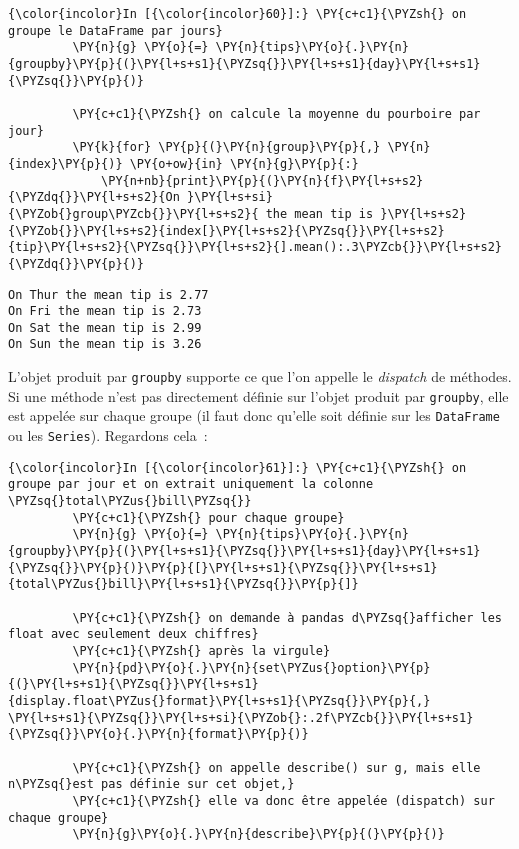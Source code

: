     \begin{Verbatim}[commandchars=\\\{\},frame=single,framerule=0.3mm,rulecolor=\color{cellframecolor}]
{\color{incolor}In [{\color{incolor}60}]:} \PY{c+c1}{\PYZsh{} on groupe le DataFrame par jours}
         \PY{n}{g} \PY{o}{=} \PY{n}{tips}\PY{o}{.}\PY{n}{groupby}\PY{p}{(}\PY{l+s+s1}{\PYZsq{}}\PY{l+s+s1}{day}\PY{l+s+s1}{\PYZsq{}}\PY{p}{)}
         
         \PY{c+c1}{\PYZsh{} on calcule la moyenne du pourboire par jour}
         \PY{k}{for} \PY{p}{(}\PY{n}{group}\PY{p}{,} \PY{n}{index}\PY{p}{)} \PY{o+ow}{in} \PY{n}{g}\PY{p}{:}
             \PY{n+nb}{print}\PY{p}{(}\PY{n}{f}\PY{l+s+s2}{\PYZdq{}}\PY{l+s+s2}{On }\PY{l+s+si}{\PYZob{}group\PYZcb{}}\PY{l+s+s2}{ the mean tip is }\PY{l+s+s2}{\PYZob{}}\PY{l+s+s2}{index[}\PY{l+s+s2}{\PYZsq{}}\PY{l+s+s2}{tip}\PY{l+s+s2}{\PYZsq{}}\PY{l+s+s2}{].mean():.3\PYZcb{}}\PY{l+s+s2}{\PYZdq{}}\PY{p}{)}
\end{Verbatim}


    \begin{Verbatim}[commandchars=\\\{\},frame=single,framerule=0.3mm,rulecolor=\color{cellframecolor}]
On Thur the mean tip is 2.77
On Fri the mean tip is 2.73
On Sat the mean tip is 2.99
On Sun the mean tip is 3.26
\end{Verbatim}

    L'objet produit par \texttt{groupby} supporte ce que l'on appelle le
\emph{dispatch} de méthodes. Si une méthode n'est pas directement
définie sur l'objet produit par \texttt{groupby}, elle est appelée sur
chaque groupe (il faut donc qu'elle soit définie sur les
\texttt{DataFrame} ou les \texttt{Series}). Regardons cela~:

    \begin{Verbatim}[commandchars=\\\{\},frame=single,framerule=0.3mm,rulecolor=\color{cellframecolor}]
{\color{incolor}In [{\color{incolor}61}]:} \PY{c+c1}{\PYZsh{} on groupe par jour et on extrait uniquement la colonne \PYZsq{}total\PYZus{}bill\PYZsq{}}
         \PY{c+c1}{\PYZsh{} pour chaque groupe}
         \PY{n}{g} \PY{o}{=} \PY{n}{tips}\PY{o}{.}\PY{n}{groupby}\PY{p}{(}\PY{l+s+s1}{\PYZsq{}}\PY{l+s+s1}{day}\PY{l+s+s1}{\PYZsq{}}\PY{p}{)}\PY{p}{[}\PY{l+s+s1}{\PYZsq{}}\PY{l+s+s1}{total\PYZus{}bill}\PY{l+s+s1}{\PYZsq{}}\PY{p}{]}
         
         \PY{c+c1}{\PYZsh{} on demande à pandas d\PYZsq{}afficher les float avec seulement deux chiffres}
         \PY{c+c1}{\PYZsh{} après la virgule}
         \PY{n}{pd}\PY{o}{.}\PY{n}{set\PYZus{}option}\PY{p}{(}\PY{l+s+s1}{\PYZsq{}}\PY{l+s+s1}{display.float\PYZus{}format}\PY{l+s+s1}{\PYZsq{}}\PY{p}{,} \PY{l+s+s1}{\PYZsq{}}\PY{l+s+si}{\PYZob{}:.2f\PYZcb{}}\PY{l+s+s1}{\PYZsq{}}\PY{o}{.}\PY{n}{format}\PY{p}{)}
         
         \PY{c+c1}{\PYZsh{} on appelle describe() sur g, mais elle n\PYZsq{}est pas définie sur cet objet,}
         \PY{c+c1}{\PYZsh{} elle va donc être appelée (dispatch) sur chaque groupe}
         \PY{n}{g}\PY{o}{.}\PY{n}{describe}\PY{p}{(}\PY{p}{)}
\end{Verbatim}



